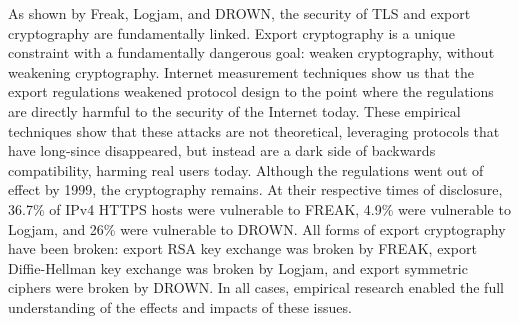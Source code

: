 As shown by Freak, Logjam, and DROWN, the security of TLS and export
cryptography are fundamentally linked. Export cryptography is a unique
constraint with a fundamentally dangerous goal: weaken cryptography, without
weakening cryptography. Internet measurement techniques show us that the export
regulations weakened protocol design to the point where the regulations are
directly harmful to the security of the Internet today. These empirical
techniques show that these attacks are not theoretical, leveraging protocols
that have long-since disappeared, but instead are a dark side of backwards
compatibility, harming real users today. Although the regulations went out of
effect by 1999, the cryptography remains. At their respective times of
disclosure, 36.7\% of IPv4 HTTPS hosts were vulnerable to FREAK, 4.9\% were
vulnerable to Logjam, and 26\% were vulnerable to DROWN. All forms of export
cryptography have been broken: export RSA key exchange was broken by FREAK,
export Diffie-Hellman key exchange was broken by Logjam, and export symmetric
ciphers were broken by DROWN. In all cases, empirical research enabled the full
understanding of the effects and impacts of these issues.

